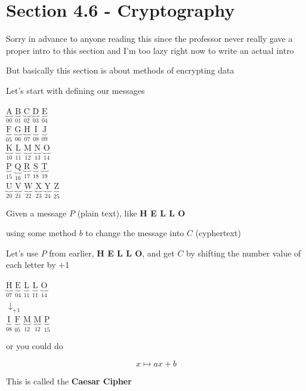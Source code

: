 \documentclass[../../Main.tex]{subfiles}
\begin{document}
\section{Section 4.6 - Cryptography}

Sorry in advance to anyone reading this since the professor never really gave a proper intro to this section and I'm too lazy right now to write an actual intro

But basically this section is about methods of encrypting data

Let's start with defining our messages

\begin{center}
    $\underbrace{\text{A}}_{00}$ \; $\underbrace{\text{B}}_{01}$ \; $\underbrace{\text{C}}_{02}$ \; $\underbrace{\text{D}}_{03}$ \; $\underbrace{\text{E}}_{04}$ \\
    $\underbrace{\text{F}}_{05}$ \; $\underbrace{\text{G}}_{06}$ \; $\underbrace{\text{H}}_{07}$ \; $\underbrace{\text{I}}_{08}$ \; $\underbrace{\text{J}}_{09}$ \\
    $\underbrace{\text{K}}_{10}$ \; $\underbrace{\text{L}}_{11}$ \; $\underbrace{\text{M}}_{12}$ \; $\underbrace{\text{N}}_{13}$ \; $\underbrace{\text{O}}_{14}$ \\
    $\underbrace{\text{P}}_{15}$ \; $\underbrace{\text{Q}}_{16}$ \; $\underbrace{\text{R}}_{17}$ \; $\underbrace{\text{S}}_{18}$ \; $\underbrace{\text{T}}_{19}$ \\
    $\underbrace{\text{U}}_{20}$ \; $\underbrace{\text{V}}_{21}$ \; $\underbrace{\text{W}}_{22}$ \; $\underbrace{\text{X}}_{23}$ \; $\underbrace{\text{Y}}_{24}$ \; $\underbrace{\text{Z}}_{25}$ \\
\end{center}

\begin{definition}[Encryption]
    Given a message $P$ (plain text), like \textbf{H E L L O}

    using some method $b$ to change the message into $C$ (cyphertext)
\end{definition}

\begin{example}
    Let's use $P$ from earlier, \textbf{H E L L O}, and get $C$ by shifting the number value of each letter by $+1$

    \begin{center}
        $\underbrace{\text{H}}_{07}$ \; $\underbrace{\text{E}}_{04}$ \; $\underbrace{\text{L}}_{11}$ \; $\underbrace{\text{L}}_{11}$ \; $\underbrace{\text{O}}_{14}$ \\
        
        ${\downarrow}_{+1}$ \\

        $\underbrace{\text{I}}_{08}$ \; $\underbrace{\text{F}}_{05}$ \; $\underbrace{\text{M}}_{12}$ \; $\underbrace{\text{M}}_{12}$ \; $\underbrace{\text{P}}_{15}$ \\
    \end{center}

    or you could do 

    $$x \mapsto ax + b$$

    This is called the \textbf{Caesar Cipher}
\end{example}
\end{document}
